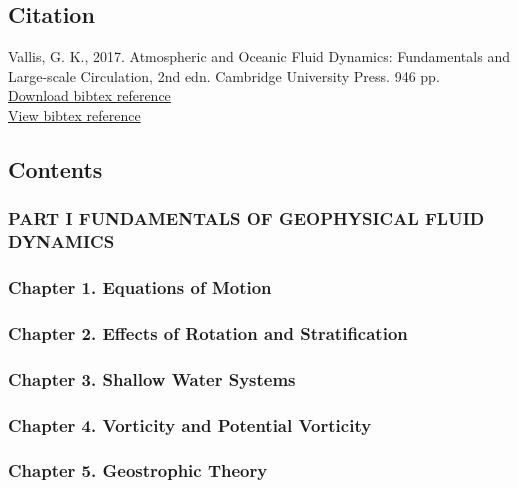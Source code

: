 \subsection{Citation}\label{citation}

Vallis, G. K., 2017. Atmospheric and Oceanic Fluid Dynamics:
Fundamentals and Large-scale Circulation, 2nd edn. Cambridge University
Press. 946 pp.\\[2\baselineskip]\href{Vallis.bib}{Download bibtex
reference}\\
\href{Vallis.bib}{View bibtex reference}\\[4\baselineskip]

\subsection{Contents}\label{contents}

\subsubsection{PART I FUNDAMENTALS OF GEOPHYSICAL FLUID
DYNAMICS}\label{part-i-fundamentals-of-geophysical-fluid-dynamics}

\subsubsection{Chapter 1. Equations of
Motion}\label{chapter-1.-equations-of-motion}

\subsubsection{Chapter 2. Effects of Rotation and
Stratification}\label{chapter-2.-effects-of-rotation-and-stratification}

\subsubsection{Chapter 3. Shallow Water
Systems}\label{chapter-3.-shallow-water-systems}

\subsubsection{Chapter 4. Vorticity and Potential
Vorticity}\label{chapter-4.-vorticity-and-potential-vorticity}

\subsubsection{Chapter 5. Geostrophic
Theory}\label{chapter-5.-geostrophic-theory}

